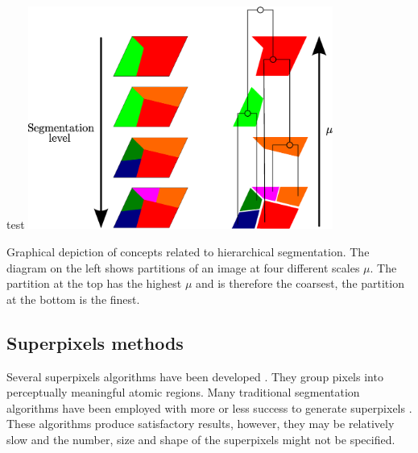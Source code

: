 
\begin{figurethesis}{test}
\includegraphics[width=0.75\textwidth]{Figures/seg_hierar}
\caption{Graphical depiction of concepts related to hierarchical segmentation. The diagram on the left shows partitions of an image at four different scales $\mu$. The partition at the top has the highest $\mu$ and is therefore the coarsest, the partition at the bottom is the finest.}
\label{fig:seg_hierar}
\end{figurethesis}


\subsection{Superpixels methods}
Several superpixels algorithms have been developed \citep{achanta2012slic}. They group pixels into perceptually meaningful atomic regions. Many traditional segmentation algorithms have been employed with more or less success to generate superpixels \citep{shi2000normalized, felzenszwalb2004efficient, comaniciu2002mean, vedaldi2008quick, vincent1991watersheds}. These algorithms produce satisfactory results, however, they may be relatively slow and the number, size and shape of the superpixels might not be specified. \\

